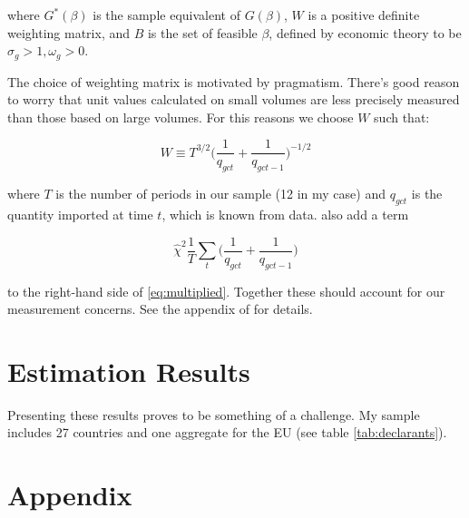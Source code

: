 \documentclass[12pt,a4paper,hidelinks]{article}            %
\begin{document}
where $G^*(\beta)$ is the sample equivalent of $G(\beta)$, $W$ is a positive definite weighting matrix, and $B$ is the set of feasible $\beta$, defined by economic theory to be $\sigma_g > 1, \omega_g > 0$.

The choice of weighting matrix is motivated by pragmatism.  There's good reason to worry that unit values calculated on small volumes are less precisely measured than those based on large volumes.  For this reasons we choose $W$ such that:

\begin{equation}
    W \equiv T^{3/2}\Big(\frac{1}{q_{gct}} + \frac{1}{q_{gct - 1}})^{-1/2}
\end{equation}

where $T$ is the number of periods in our sample (12 in my case) and $q_{gct}$ is the quantity imported at time $t$, which is known from data.  \cite{broda_weinstein_2006_globalization_gains} also add a term

\begin{equation}
    \hat{\chi}^2 \frac{1}{T} \sum_t \big(\frac{1}{q_{gct}} + \frac{1}{q_{gct-1}})
\end{equation}

to the right-hand side of \ref{eq:multiplied}.  Together these should account for our measurement concerns.  See the appendix of \cite{broda_weinstein_2006_globalization_gains} for details.

\section{Estimation Results}
\label{sec:estimation_results}

Presenting these results proves to be something of a challenge.  My sample includes 27 countries and one aggregate for the EU (see table \ref{tab:declarants}).  

\newpage



\newpage

\section{Appendix}
\label{sec:appendix}
\end{document}
